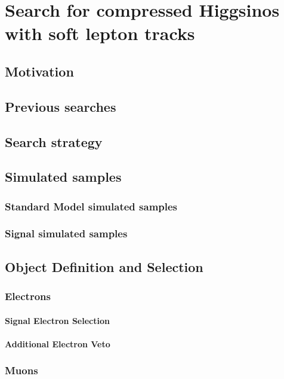 \chapter{Search for compressed Higgsinos  with soft
lepton tracks}

\section{Motivation}

\section{Previous searches}




\section{Search strategy}

\section{Simulated samples}
\subsection{Standard Model simulated samples}
\subsection{Signal simulated samples}

\section{Object Definition and Selection}
\subsection{Electrons}
\subsubsection{Signal Electron Selection}
\subsubsection{Additional Electron Veto}
\subsection{Muons}
